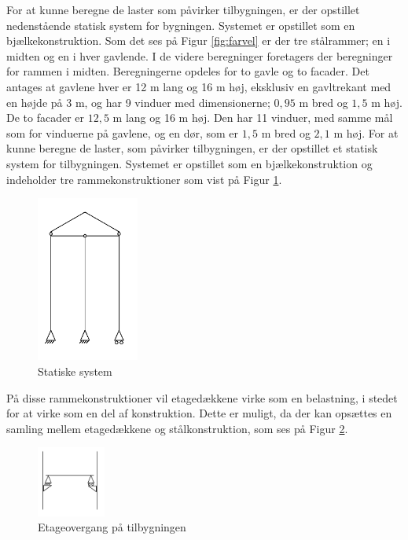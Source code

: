 For at kunne beregne de laster som påvirker tilbygningen, er der opstillet nedenstående statisk system for bygningen. Systemet er opstillet som en bjælkekonstruktion. Som det ses på Figur \ref{fig:farvel} er der tre stålrammer; en i midten og en i hver gavlende. I de videre beregninger foretagers der beregninger for rammen i midten.
\newline
\newline
Beregningerne opdeles for to gavle og to facader. Det antages at gavlene hver er 12 m lang og 16 m høj, eksklusiv en gavltrekant med en højde på 3 m, og har 9 vinduer med dimensionerne; $0,\!95$ m bred og $1,\!5$ m høj.
\newline
\newline
De to facader er $12,\!5$ m lang og 16 m høj. Den har 11 vinduer, med samme mål som for vinduerne på gavlene, og en dør, som er $1,\!5$ m bred og $2,\!1$ m høj.
\newline
\newline
For at kunne beregne de laster, som påvirker tilbygningen, er der opstillet et statisk system for tilbygningen. Systemet er opstillet som en bjælkekonstruktion og indeholder tre rammekonstruktioner som vist på Figur \ref{fig:system}.

\begin{figure}[htbp]
	\centering
	\includegraphics[width=0.3\textwidth]{billeder/del1statiskesystem.png}
	\caption{Statiske system}
	\label{fig:system}
\end{figure}

På disse rammekonstruktioner vil etagedækkene virke som en belastning, i stedet for at virke som en del af konstruktion. Dette er muligt, da der kan opsættes en samling mellem etagedækkene og stålkonstruktion, som ses på Figur \ref{fig:etage}.

\begin{figure}[htbp]
	\centering
	\includegraphics[width=0.2\textwidth]{billeder/etageovergang.png}
	\caption{Etageovergang på tilbygningen}
	\label{fig:etage}
\end{figure}

